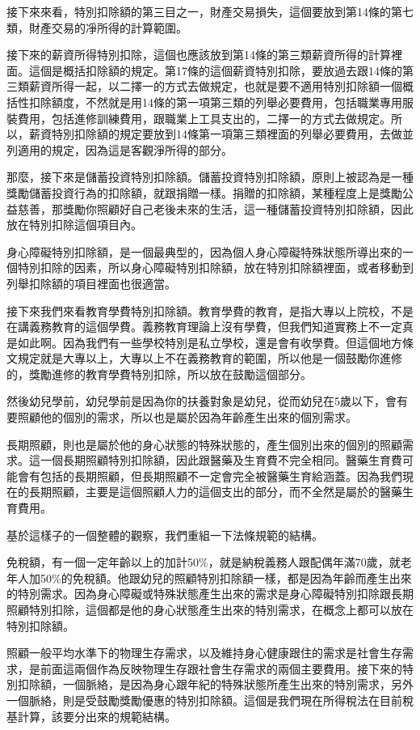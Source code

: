 \documentclass[]{ctexbook}
\begin{document}
接下來來看，特別扣除額的第三目之一，財產交易損失，這個要放到第14條的第七類，財產交易的凈所得的計算範圍。

接下來的薪資所得特別扣除，這個也應該放到第14條的第三類薪資所得的計算裡面。這個是概括扣除額的規定。第17條的這個薪資特別扣除，要放過去跟14條的第三類薪資所得一起，以二擇一的方式去做規定，也就是要不適用特別扣除額一個概括性扣除額度，不然就是用14條的第一項第三類的列舉必要費用，包括職業專用服裝費用，包括進修訓練費用，跟職業上工具支出的，二擇一的方式去做規定。所以，薪資特別扣除額的規定要放到14條第一項第三類裡面的列舉必要費用，去做並列適用的規定，因為這是客觀淨所得的部分。

那麼，接下來是儲蓄投資特別扣除額。儲蓄投資特別扣除額，原則上被認為是一種獎勵儲蓄投資行為的扣除額，就跟捐贈一樣。捐贈的扣除額，某種程度上是獎勵公益慈善，那獎勵你照顧好自己老後未來的生活，這一種儲蓄投資特別扣除額，因此放在特別扣除這個項目內。

身心障礙特別扣除額，是一個最典型的，因為個人身心障礙特殊狀態所導出來的一個特別扣除的因素，所以身心障礙特別扣除額，放在特別扣除額裡面，或者移動到列舉扣除額的項目裡面也很適當。

接下來我們來看教育學費特別扣除額。教育學費的教育，是指大專以上院校，不是在講義務教育的這個學費。義務教育理論上沒有學費，但我們知道實務上不一定真是如此啊。因為我們有一些學校特別是私立學校，還是會有收學費。但這個地方條文規定就是大專以上，大專以上不在義務教育的範圍，所以他是一個鼓勵你進修的，獎勵進修的教育學費特別扣除，所以放在鼓勵這個部分。

然後幼兒學前，幼兒學前是因為你的扶養對象是幼兒，從而幼兒在5歲以下，會有要照顧他的個別的需求，所以也是屬於因為年齡產生出來的個別需求。

長期照顧，則也是屬於他的身心狀態的特殊狀態的，產生個別出來的個別的照顧需求。這一個長期照顧特別扣除額，因此跟醫藥及生育費不完全相同。醫藥生育費可能會有包括的長期照顧，但長期照顧不一定會完全被醫藥生育給涵蓋。因為我們現在的長期照顧，主要是這個照顧人力的這個支出的部分，而不全然是屬於的醫藥生育費用。

基於這樣子的一個整體的觀察，我們重組一下法條規範的結構。

免稅額，有一個一定年齡以上的加計50\%，就是納稅義務人跟配偶年滿70歲，就老年人加50\%的免稅額。他跟幼兒的照顧特別扣除額一樣，都是因為年齡而產生出來的特別需求。因為身心障礙或特殊狀態產生出來的需求是身心障礙特別扣除跟長期照顧特別扣除，這個都是他的身心狀態產生出來的特別需求，在概念上都可以放在特別扣除額。

照顧一般平均水準下的物理生存需求，以及維持身心健康跟住的需求是社會生存需求，是前面這兩個作為反映物理生存跟社會生存需求的兩個主要費用。接下來的特別扣除額，一個脈絡，是因為身心跟年紀的特殊狀態所產生出來的特別需求，另外一個脈絡，則是受鼓勵獎勵優惠的特別扣除額。這個是我們現在所得稅法在目前稅基計算，該要分出來的規範結構。
\end{document}
